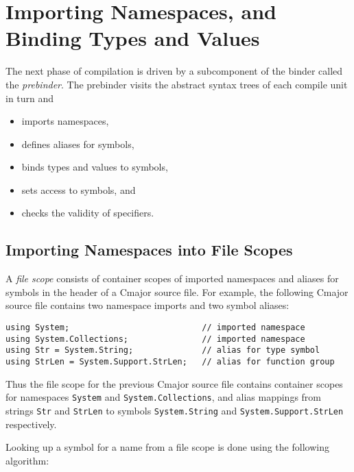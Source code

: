 \documentclass[a4paper,oneside,11pt]{book}
\theoremstyle{definition}
\begin{document}
\chapter{Importing Namespaces, and Binding Types and Values}\label{bindingtypesandvalues}

The next phase of compilation is driven by a subcomponent of the binder called the \emph{prebinder}.
The prebinder visits the abstract syntax trees of each compile unit in turn and
\begin{itemize}
\item
imports namespaces,
\item
defines aliases for symbols,
\item
binds types and values to symbols,
\item
sets access to symbols, and
\item
checks the validity of specifiers.
\end{itemize}

\section{Importing Namespaces into File Scopes}\label{filescope}

A \emph{file scope} consists of container scopes of imported namespaces and aliases for symbols in the header of a Cmajor source file.
For example, the following Cmajor source file contains two namespace imports and two symbol aliases:

\lstset{language=Cmajor}
\begin{lstlisting}[frame=trBL]
using System;                           // imported namespace
using System.Collections;               // imported namespace
using Str = System.String;              // alias for type symbol
using StrLen = System.Support.StrLen;   // alias for function group
\end{lstlisting}

Thus the file scope for the previous Cmajor source file contains container scopes for namespaces \verb|System| and \verb|System.Collections|, and
alias mappings from strings \verb|Str| and \verb|StrLen| to symbols \verb|System.String| and \verb|System.Support.StrLen| respectively.

Looking up a symbol for a name from a file scope is done using the following algorithm:
\end{document}
